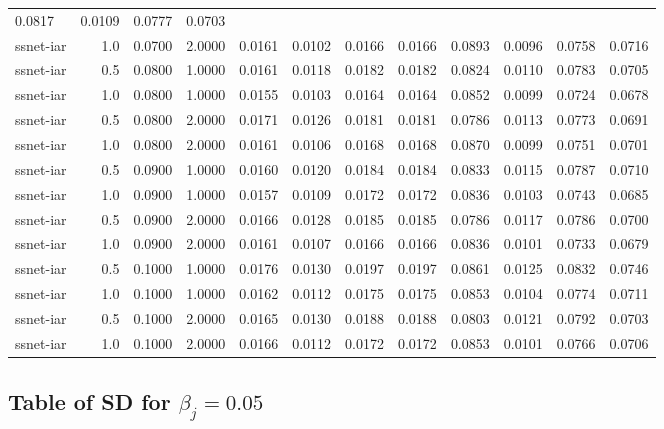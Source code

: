 \documentclass[
]{article}
\begin{document}
\begin{longtable}[]{@{}lrrrrrrrrrrr@{}}
0.0817 & 0.0109 & 0.0777 & 0.0703 \\
ssnet-iar & 1.0 & 0.0700 & 2.0000 & 0.0161 & 0.0102 & 0.0166 & 0.0166 &
0.0893 & 0.0096 & 0.0758 & 0.0716 \\
ssnet-iar & 0.5 & 0.0800 & 1.0000 & 0.0161 & 0.0118 & 0.0182 & 0.0182 &
0.0824 & 0.0110 & 0.0783 & 0.0705 \\
ssnet-iar & 1.0 & 0.0800 & 1.0000 & 0.0155 & 0.0103 & 0.0164 & 0.0164 &
0.0852 & 0.0099 & 0.0724 & 0.0678 \\
ssnet-iar & 0.5 & 0.0800 & 2.0000 & 0.0171 & 0.0126 & 0.0181 & 0.0181 &
0.0786 & 0.0113 & 0.0773 & 0.0691 \\
ssnet-iar & 1.0 & 0.0800 & 2.0000 & 0.0161 & 0.0106 & 0.0168 & 0.0168 &
0.0870 & 0.0099 & 0.0751 & 0.0701 \\
ssnet-iar & 0.5 & 0.0900 & 1.0000 & 0.0160 & 0.0120 & 0.0184 & 0.0184 &
0.0833 & 0.0115 & 0.0787 & 0.0710 \\
ssnet-iar & 1.0 & 0.0900 & 1.0000 & 0.0157 & 0.0109 & 0.0172 & 0.0172 &
0.0836 & 0.0103 & 0.0743 & 0.0685 \\
ssnet-iar & 0.5 & 0.0900 & 2.0000 & 0.0166 & 0.0128 & 0.0185 & 0.0185 &
0.0786 & 0.0117 & 0.0786 & 0.0700 \\
ssnet-iar & 1.0 & 0.0900 & 2.0000 & 0.0161 & 0.0107 & 0.0166 & 0.0166 &
0.0836 & 0.0101 & 0.0733 & 0.0679 \\
ssnet-iar & 0.5 & 0.1000 & 1.0000 & 0.0176 & 0.0130 & 0.0197 & 0.0197 &
0.0861 & 0.0125 & 0.0832 & 0.0746 \\
ssnet-iar & 1.0 & 0.1000 & 1.0000 & 0.0162 & 0.0112 & 0.0175 & 0.0175 &
0.0853 & 0.0104 & 0.0774 & 0.0711 \\
ssnet-iar & 0.5 & 0.1000 & 2.0000 & 0.0165 & 0.0130 & 0.0188 & 0.0188 &
0.0803 & 0.0121 & 0.0792 & 0.0703 \\
ssnet-iar & 1.0 & 0.1000 & 2.0000 & 0.0166 & 0.0112 & 0.0172 & 0.0172 &
0.0853 & 0.0101 & 0.0766 & 0.0706 \\
\bottomrule
\end{longtable}

\hypertarget{table-of-sd-for-beta_j-0.05}{%
\subsection{\texorpdfstring{Table of SD for
\(\beta_j = 0.05\)}{Table of SD for \textbackslash beta\_j = 0.05}}\label{table-of-sd-for-beta_j-0.05}}
\end{document}
